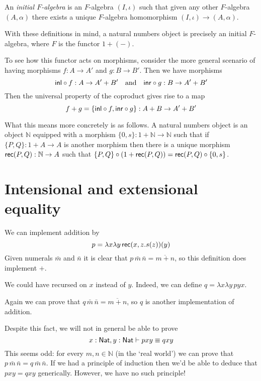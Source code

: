 \documentclass[12pt]{article}
\begin{document}
An \emph{initial $F$-algebra} is an $F$-algebra $(I, \iota)$ such that given any other $F$-algebra $(A, \alpha)$ there exists a unique $F$-algebra homomorphism $(I, \iota) \to (A, \alpha)$.

With these definitions in mind, a natural numbers object is precisely an initial $F$-algebra, where $F$ is the functor $1 + (-)$.

To see how this functor acts on morphisms, consider the more general scenario of having morphisms $f : A \to A'$ and $g : B \to B'$. Then we have morphisms
\begin{equation*}
{\mathsf{inl}} \circ f : A \to A'+B' \quad \text{and} \quad {\mathsf{inr}} \circ g : B \to A' + B'
\end{equation*}
Then the universal property of the coproduct gives rise to a map
\begin{equation*}
f + g = \{ {\mathsf{inl}} \circ f, {\mathsf{inr}} \circ g \} : A+B \to A'+B'
\end{equation*}

What this means more concretely is as follows. A natural numbers object is an object $\mathbb{N}$ equipped with a morphism $\{0,s\} : 1 + \mathbb{N} \to \mathbb{N}$ such that if $\{P,Q\} : 1 + A \to A$ is another morphism then there is a unique morphism $\mathsf{rec}(P,Q) : \mathbb{N} \to A$ such that $\{P,Q\} \circ (1 + \mathsf{rec}(P,Q)) = \mathsf{rec}(P,Q) \circ \{ 0,s \}$.

\section{Intensional and extensional equality}

We can implement addition by
\begin{equation*}
p = \lambda x \lambda y\, \mathsf{rec}(x, z.s(z))(y)
\end{equation*}
Given numerals $\bar m$ and $\bar n$ it is clear that $p\, \bar m\, \bar n = \overline{m+n}$, so this definition does implement $+$.

We could have recursed on $x$ instead of $y$. Indeed, we can define $q = \lambda x \lambda y\, pyx$.

Again we can prove that $q\, \bar m\, \bar n = \overline{m+n}$, so $q$ is another implementation of addition.

Despite this fact, we will not in general be able to prove
\begin{equation*}
x : \mathsf{Nat}, y : \mathsf{Nat} \vdash pxy \equiv qxy
\end{equation*}
This seems odd: for every $m, n \in \mathbb{N}$ (in the `real world') we can prove that $p\, \bar m\, \bar n = q\, \bar m\, \bar n$. If we had a principle of induction then we'd be able to deduce that $pxy=qxy$ generically. However, we have no such principle!
\end{document}
